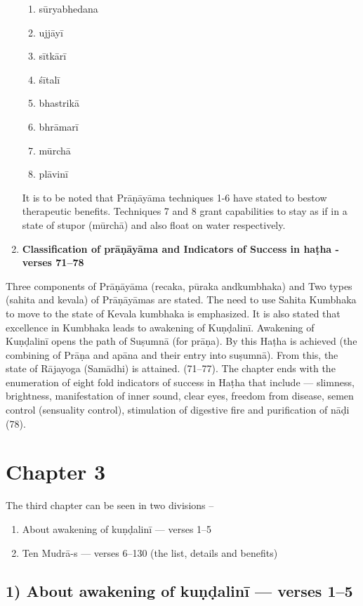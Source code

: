 \begin{enumerate}
\begin{enumerate}
\item sūryabhedana
\item ujjāyī
\item sītkārī
\item śītalī
\item bhastrikā
\item bhrāmarī
\item mūrchā
\item plāvinī
\end{enumerate}

It is to be noted that Prāṇāyāma techniques 1-6 have stated to bestow therapeutic benefits. Techniques 7 and 8 grant capabilities to stay as if in a state of stupor (mūrchā) and also float on water respectively.

\item \textbf{Classification of prāṇāyāma and   Indicators of  Success in haṭha - verses 71--78}
\end{enumerate}

Three components of Prāṇāyāma (recaka, pūraka andkumbhaka) and Two types (sahita and kevala) of Prāṇāyāmas are stated. The need to use Sahita Kumbhaka to move to the state of Kevala kumbhaka is emphasized. It is also stated that excellence in Kumbhaka leads to awakening of Kuṇḍalinī. Awakening of Kuṇḍalinī opens the path of Suṣumnā (for prāṇa). By this Haṭha is achieved (the combining of Prāṇa and apāna and their entry into suṣumnā).  From this, the state of Rājayoga (Samādhi) is attained. (71--77). The chapter ends with the  enumeration of eight fold indicators of success in Haṭha that include --- slimness, brightness, manifestation of inner sound, clear eyes, freedom from disease, semen control (sensuality control), stimulation of digestive fire and purification of nāḍi (78). 

\section*{Chapter 3}

The third chapter can be seen in two divisions –

\begin{enumerate}
\item About awakening of kuṇḍalinī --- verses 1--5
\item Ten Mudrā-s --- verses 6--130 (the list, details and benefits)
\end{enumerate}

\subsection*{1) About awakening of kuṇḍalinī --- verses 1--5}

